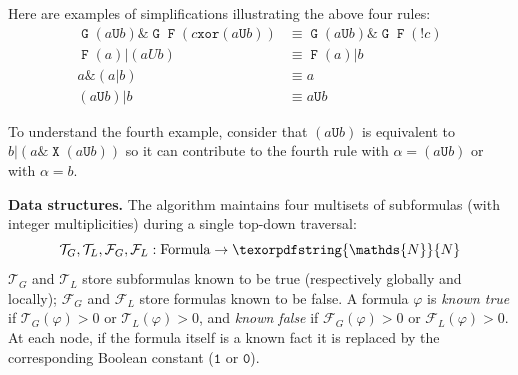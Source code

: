 \documentclass[a4paper,twoside,10pt,DIV=12]{scrreprt}
\newcommand{\N}{\texorpdfstring{\ensuremath{\mathds{N}}}{N}}
\DeclareMathOperator{\F}{\texttt{F}}
\DeclareMathOperator{\G}{\texttt{G}}
\newcommand{\U}{\mathbin{\texttt{U}}}
\DeclareMathOperator{\X}{\texttt{X}}
\DeclareMathOperator{\NOT}{\texttt{!}}
\newcommand{\XOR}{\mathbin{\texttt{xor}}}
\newcommand{\OR}{\mathbin{\texttt{|}}}
\newcommand{\AND}{\mathbin{\texttt{\&}}}
\newcommand{\0}{\texttt{0}}
\newcommand{\1}{\texttt{1}}
\begin{document}
Here are examples of simplifications illustrating the above four rules:
\begin{align*}
  \G(a \U b) \AND \G\F(c \XOR (a \U b)) &\equiv \G(a \U b) \AND \G\F(\NOT c) \\
  \F(a) \OR (a U b) &\equiv \F(a) \OR b \\
  a \AND (a \OR b)             &\equiv a \\
  (a \U b) \OR b              &\equiv a \U b
\end{align*}

To understand the fourth example, consider that $(a \U b)$ is
equivalent to $b \OR (a \AND \X(a \U b))$ so it can contribute to the
fourth rule with $\alpha=(a \U b)$ or with $\alpha=b$.

\medskip\noindent
\textbf{Data structures.}
The algorithm maintains four multisets of subformulas (with integer
multiplicities) during a single top-down traversal:
\[
  \mathcal{T}_G,\mathcal{T}_L,\mathcal{F}_G,\mathcal{F}_L : \text{Formula} \to \N
\]
$\mathcal{T}_G$ and $\mathcal{T}_L$ store subformulas known to be true
(respectively globally and locally); $\mathcal{F}_G$ and
$\mathcal{F}_L$ store formulas known to be false.  A formula $\varphi$
is \emph{known true} if $\mathcal{T}_G(\varphi)>0$ or
$\mathcal{T}_L(\varphi)>0$, and \emph{known false} if
$\mathcal{F}_G(\varphi)>0$ or $\mathcal{F}_L(\varphi)>0$.  At each
node, if the formula itself is a known fact it is replaced by the
corresponding Boolean constant ($\1$ or $\0$).
\end{document}
